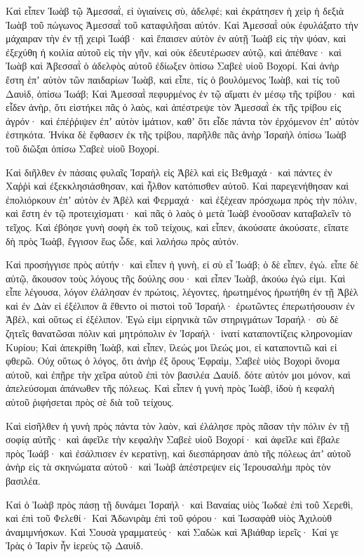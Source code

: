 {\par }{\PP {}Καὶ εἶπεν Ἰωὰβ τῷ Ἀμεσσαῒ, εἰ ὑγιαίνεις σὺ, ἀδελφέ; καὶ ἐκράτησεν ἡ χεὶρ ἡ δεξιὰ Ἰωὰβ τοῦ πώγωνος Ἀμεσσαῒ τοῦ καταφιλῆσαι αὐτόν.
Καὶ Ἀμεσσαῒ οὐκ ἐφυλάξατο τὴν μάχαιραν τὴν ἐν τῇ χειρὶ Ἰωάβ· καὶ ἔπαισεν αὐτὸν ἐν αὐτῇ Ἰωὰβ εἰς τὴν ψόαν, καὶ ἐξεχύθη ἡ κοιλία αὐτοῦ εἰς τὴν γῆν, καὶ οὐκ ἐδευτέρωσεν αὐτῷ, καὶ ἀπέθανε· καὶ Ἰωὰβ καὶ Ἀβεσσαῒ ὁ ἀδελφὸς αὐτοῦ ἐδίωξεν ὀπίσω Σαβεὲ υἱοῦ Βοχορί.
Καὶ ἀνὴρ ἔστη ἐπʼ αὐτὸν τῶν παιδαρίων Ἰωὰβ, καὶ εἶπε, τίς ὁ βουλόμενος Ἰωὰβ, καὶ τίς τοῦ Δαυὶδ, ὀπίσω Ἰωάβ;
Καὶ Ἀμεσσαῒ πεφυρμένος ἐν τῷ αἵματι ἐν μέσῳ τῆς τρίβου· καὶ εἶδεν ἀνὴρ, ὅτι εἱστήκει πᾶς ὁ λαὸς, καὶ ἀπέστρεψε τὸν Ἀμεσσαῒ ἐκ τῆς τρίβου εἰς ἀγρόν· καὶ ἐπέῤῥιψεν ἐπʼ αὐτὸν ἱμάτιον, καθʼ ὅτι εἶδε πάντα τὸν ἐρχόμενον ἐπʼ αὐτὸν ἑστηκότα.
Ἡνίκα δὲ ἔφθασεν ἐκ τῆς τρίβου, παρῆλθε πᾶς ἀνὴρ Ἰσραὴλ ὀπίσω Ἰωὰβ τοῦ διῶξαι ὀπίσω Σαβεὲ υἱοῦ Βοχορί.
\par }{\PP {}Καὶ διῆλθεν ἐν πάσαις φυλαῖς Ἰσραὴλ εἰς Ἀβὲλ καὶ εἰς Βεθμαχά· καὶ πάντες ἐν Χαῤῥὶ καὶ ἐξεκκλησιάσθησαν, καὶ ἦλθον κατόπισθεν αὐτοῦ.
Καὶ παρεγενήθησαν καὶ ἐπολιόρκουν ἐπʼ αὐτὸν ἐν Ἀβὲλ καὶ Φερμαχά· καὶ ἐξέχεαν πρόσχωμα πρὸς τὴν πόλιν, καὶ ἔστη ἐν τῷ προτειχίσματι· καὶ πᾶς ὁ λαὸς ὁ μετὰ Ἰωὰβ ἐνοοῦσαν καταβαλεῖν τὸ τεῖχος.
Καὶ ἐβόησε γυνὴ σοφὴ ἐκ τοῦ τείχους, καὶ εἶπεν, ἀκούσατε ἀκούσατε, εἴπατε δὴ πρὸς Ἰωὰβ, ἔγγισον ἕως ὧδε, καὶ λαλήσω πρὸς αὐτόν.
\par }{\PP {}Καὶ προσήγγισε πρὸς αὐτήν· καὶ εἶπεν ἡ γυνὴ, εἰ σὺ εἶ Ἰωάβ; ὁ δὲ εἶπεν, ἐγώ. εἶπε δὲ αὐτῷ, ἄκουσον τοὺς λόγους τῆς δούλης σου· καὶ εἶπεν Ἰωὰβ, ἀκούω ἐγώ εἰμι.
Καὶ εἶπε λέγουσα, λόγον ἐλάλησαν ἐν πρώτοις, λέγοντες, ἠρωτημένος ἠρωτήθη ἐν τῇ Ἀβὲλ καὶ ἐν Δὰν εἰ ἐξέλιπον ἃ ἔθεντο οἱ πιστοὶ τοῦ Ἰσραήλ· ἐρωτῶντες ἐπερωτήσουσιν ἐν Ἀβὲλ, καὶ οὕτως εἰ ἐξέλιπον.
Ἐγώ εἰμι εἰρηνικὰ τῶν στηριγμάτων Ἰσραήλ· σὺ δὲ ζητεῖς θανατῶσαι πόλιν καὶ μητρόπολιν ἐν Ἰσραήλ· ἱνατί καταποντίζεις κληρονομίαν Κυρίου;
Καὶ ἀπεκρίθη Ἰωὰβ, καὶ εἶπεν, ἵλεώς μοι ἵλεώς μοι, εἰ καταποντιῶ καὶ εἰ φθερῶ.
Οὐχ οὕτως ὁ λόγος, ὅτι ἀνὴρ ἐξ ὄρους Ἐφραὶμ, Σαβεὲ υἱὸς Βοχορὶ ὄνομα αὐτοῦ, καὶ ἐπῇρε τὴν χεῖρα αὐτοῦ ἐπὶ τὸν βασιλέα Δαυίδ. δότε αὐτόν μοι μόνον, καὶ ἀπελεύσομαι ἀπάνωθεν τῆς πόλεως. Καὶ εἶπεν ἡ γυνὴ πρὸς Ἰωὰβ, ἰδοὺ ἡ κεφαλὴ αὐτοῦ ῥιφήσεται πρὸς σὲ διὰ τοῦ τείχους.
\par }{\PP {}Καὶ εἰσῆλθεν ἡ γυνὴ πρὸς πάντα τὸν λαὸν, καὶ ἐλάλησε πρὸς πᾶσαν τὴν πόλιν ἐν τῇ σοφίᾳ αὐτῆς· καὶ ἀφεῖλε τὴν κεφαλὴν Σαβεὲ υἱοῦ Βοχορί· καὶ ἀφεῖλε καὶ ἔβαλε πρὸς Ἰωάβ· καὶ ἐσάλπισεν ἐν κερατίνῃ, καὶ διεσπάρησαν ἀπὸ τῆς πόλεως ἀπʼ αὐτοῦ ἀνὴρ εἰς τὰ σκηνώματα αὐτοῦ· καὶ Ἰωὰβ ἀπέστρεψεν εἰς Ἰερουσαλὴμ πρὸς τὸν βασιλέα.
\par }{\PP {}Καὶ ὁ Ἰωὰβ πρὸς πάσῃ τῇ δυνάμει Ἰσραήλ· καὶ Βαναίας υἱὸς Ἰωδαὲ ἐπὶ τοῦ Χερεθὶ, καὶ ἐπὶ τοῦ Φελεθί·
Καὶ Ἀδωνιρὰμ ἐπὶ τοῦ φόρου· καὶ Ἰωσαφὰθ υἱὸς Ἀχιλοὺθ ἀναμιμνήσκων.
Καὶ Σουσὰ γραμματεύς· καὶ Σαδὼκ καὶ Ἀβιάθαρ ἱερεῖς·
Καί γε Ἰρὰς ὁ Ἰαρὶν ἦν ἱερεὺς τῷ Δαυίδ.

}
